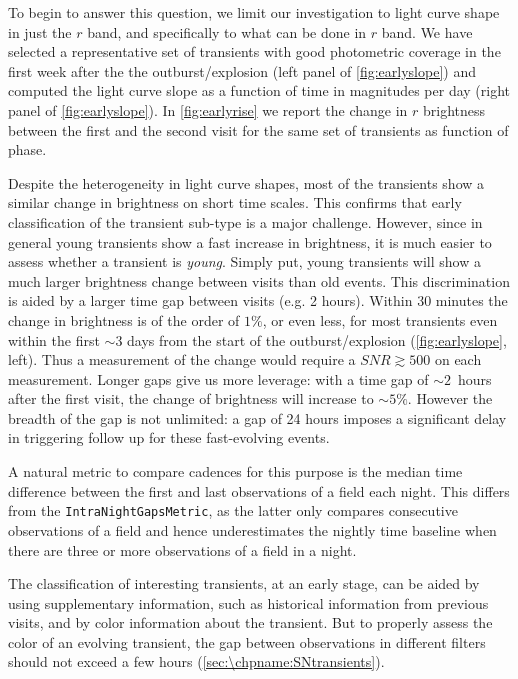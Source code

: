 To begin to answer this question, we limit our investigation to light curve shape in just the $r$ band, and specifically to what can be done in $r$ band. We have selected a representative set of transients with good photometric coverage in the first week after the the outburst/explosion (left panel of \autoref{fig:earlyslope}) and computed the light curve slope as a function of time in magnitudes per day (right panel of \autoref{fig:earlyslope}). In \autoref{fig:earlyrise} we report the change in $r$ brightness between the first and the second visit for the same set of transients as function of phase.

Despite the heterogeneity in light curve shapes, most of the transients show a similar change in brightness on short time scales. 
This confirms that early classification of the transient sub-type is a
major challenge. However, since in general young transients show a fast
increase in brightness, it is much easier to assess whether a transient is
\emph{young}.  Simply put, young transients will show a much larger
brightness change between visits than old events.
This discrimination is aided by a larger time gap between visits (e.g. 2 hours).
Within 30 minutes the change in brightness is of the order of $1\%$, or
even less, for most transients even within the first $\sim3$ days from the
start of the outburst/explosion (\autoref{fig:earlyslope}, left). Thus a
measurement of the change would require a $SNR\gtrsim500$ on each
measurement. Longer gaps give us more leverage: with a time gap of
$\sim2$~hours after the first visit, the change of brightness will increase
to $\sim5\%$. However the breadth of the gap is not unlimited: a gap of 24
hours imposes a significant delay in triggering follow up for these
fast-evolving events.

A natural metric to compare cadences for this purpose 
is the median time difference between
the first and last observations of a field each night.  This differs from
the \texttt{IntraNightGapsMetric}, as the latter only compares consecutive
observations of a field and hence underestimates the nightly time baseline
when there are three or more observations of a field in a night.

The classification of interesting transients, at an early stage, can be
aided by using supplementary information, such as historical information
from previous visits, and by color information about the transient. But to
properly assess the color of an evolving transient, the
gap between observations in different filters should not exceed a few hours 
(\autoref{sec:\chpname:SNtransients}).

